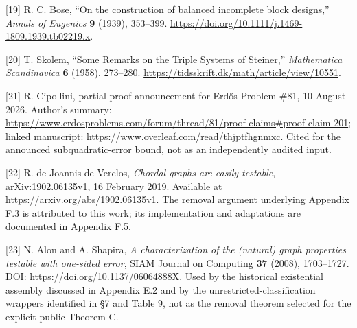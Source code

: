 \documentclass[english,11pt,a4paper]{article}
\begin{document}
{[}19{]} R. C. Bose, ``On the construction of balanced incomplete block designs,'' \emph{Annals of Eugenics} \textbf{9} (1939), 353--399. \url{https://doi.org/10.1111/j.1469-1809.1939.tb02219.x}.

{[}20{]} T. Skolem, ``Some Remarks on the Triple Systems of Steiner,'' \emph{Mathematica Scandinavica} \textbf{6} (1958), 273--280. \url{https://tidsskrift.dk/math/article/view/10551}.

{[}21{]} R. Cipollini, partial proof announcement for Erdős Problem \#81, 10 August 2026. Author's summary: \url{https://www.erdosproblems.com/forum/thread/81/proof-claims\#proof-claim-201}; linked manuscript: \url{https://www.overleaf.com/read/thjptfhgnmxc}. Cited for the announced subquadratic-error bound, not as an independently audited input.

{[}22{]} R. de Joannis de Verclos, \emph{Chordal graphs are easily testable}, arXiv:1902.06135v1, 16 February 2019. Available at \url{https://arxiv.org/abs/1902.06135v1}. The removal argument underlying Appendix F.3 is attributed to this work; its implementation and adaptations are documented in Appendix F.5.

{[}23{]} N. Alon and A. Shapira, \emph{A characterization of the (natural) graph properties testable with one-sided error}, SIAM Journal on Computing \textbf{37} (2008), 1703--1727. DOI: \url{https://doi.org/10.1137/06064888X}. Used by the historical existential assembly discussed in Appendix E.2 and by the unrestricted-classification wrappers identified in §7 and Table 9, not as the removal theorem selected for the explicit public Theorem C.

\endgroup
\end{document}
